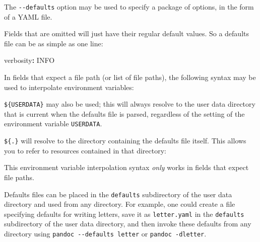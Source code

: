 \documentclass[
  b5paper
]{book}
\newenvironment{Shaded}{}{}
\newcommand{\AttributeTok}[1]{\textcolor[rgb]{0.49,0.56,0.16}{#1}}
\newcommand{\CommentTok}[1]{\textcolor[rgb]{0.38,0.63,0.69}{\textit{#1}}}
\newcommand{\FunctionTok}[1]{\textcolor[rgb]{0.02,0.16,0.49}{#1}}
\newcommand{\KeywordTok}[1]{\textcolor[rgb]{0.00,0.44,0.13}{\textbf{#1}}}
\begin{document}
The \texttt{-\/-defaults} option may be used to specify a package of
options, in the form of a YAML file.

Fields that are omitted will just have their regular default values. So
a defaults file can be as simple as one line:

\begin{Shaded}
\begin{Highlighting}[]
\FunctionTok{verbosity}\KeywordTok{:}\AttributeTok{ INFO}
\end{Highlighting}
\end{Shaded}

In fields that expect a file path (or list of file paths), the following
syntax may be used to interpolate environment variables:

\begin{Shaded}
\end{Shaded}

\texttt{\$\{USERDATA\}} may also be used; this will always resolve to
the user data directory that is current when the defaults file is
parsed, regardless of the setting of the environment variable
\texttt{USERDATA}.

\texttt{\$\{.\}} will resolve to the directory containing the defaults
file itself. This allows you to refer to resources contained in that
directory:

\begin{Shaded}
\end{Shaded}

This environment variable interpolation syntax \emph{only} works in
fields that expect file paths.

Defaults files can be placed in the \texttt{defaults} subdirectory of
the user data directory and used from any directory. For example, one
could create a file specifying defaults for writing letters, save it as
\texttt{letter.yaml} in the \texttt{defaults} subdirectory of the user
data directory, and then invoke these defaults from any directory using
\texttt{pandoc\ -\/-defaults\ letter} or \texttt{pandoc\ -dletter}.
\end{document}
